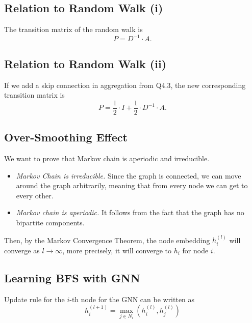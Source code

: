 \documentclass[a4paper,11pt]{article}
\begin{document}

\subsection{Relation to Random Walk (i)}

The transition matrix of the random walk is 
$$P = D^{-1} \cdot A.$$


\subsection{Relation to Random Walk (ii)}

If we add a skip connection in aggregation from Q4.3, the new corresponding transition matrix is 
$$P = \frac{1}{2} \cdot I + \frac{1}{2} \cdot D^{-1} \cdot A.$$


\subsection{Over-Smoothing Effect}

We want to prove that Markov chain is aperiodic and irreducible.
\begin{itemize}
    \item \textit{Markov Chain is irreducible.}  Since the graph is connected, we can move around the graph arbitrarily, meaning that from every node we can get to every other.
    \item \textit{Markov chain is aperiodic.}  It follows from the fact that the graph has no bipartite components.
\end{itemize}
Then, by the Markov Convergence Theorem, the node embedding $h_i^{(l)}$ will converge as $l \rightarrow \infty$, more precisely, it will converge to $h_i$ for node $i$.

\subsection{Learning BFS with GNN}

Update rule for the $i$-th node for the GNN can be written as
$$
h_i^{(l + 1)} = \max_{j \in N_i} \left( h_i^{(l)}, h_j^{(l)} \right)
$$
\end{document}
